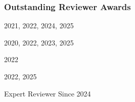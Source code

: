 \documentclass[11pt, a4paper]{article}
\newcommand{\mleftsize}{4.75em}
\begin{document}
\vspace{-3ex}
\subsubsection{Outstanding Reviewer Awards}

\begin{description}[leftmargin=\mleftsize,style=nextline,font=\normalfont\space]
    \item[ICML] 2021, 2022, 2024, 2025
    \item[NeurIPS] 2020, 2022, 2023, 2025
    \item[ICLR] 2022
    \item[AISTATS] 2022, 2025
    \item[TMLR] Expert Reviewer Since 2024
\end{description}
\end{document}
